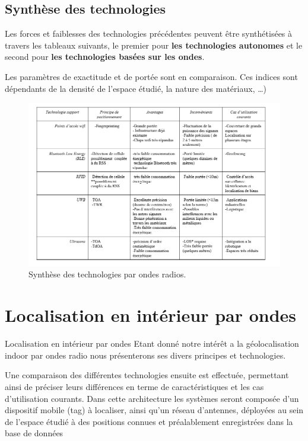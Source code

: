 \documentclass[12pt,a4paper]{report}
\begin{document}
\begin{itemize}
\subsection{Synthèse des technologies}

Les forces et faiblesses des technologies précédentes peuvent être synthétisées à travers les tableaux suivants, le premier pour\textbf{ les technologies autonomes} et le second pour \textbf{les technologies basées sur les ondes}. 

Les paramètres de exactitude et de portée sont en comparaison. Ces indices sont dépendants de la densité de l’espace étudié, la nature des matériaux, …)

	\begin{figure}[H]
	\centering
	\includegraphics[width=1.1\linewidth]{Pics/technologies.PNG}
	\caption{Synthèse des technologies par ondes radios.}
	\label{fig:technologies}
	
\end{figure}



\section{Localisation en intérieur par ondes }

Localisation en intérieur par ondes 
Etant donné notre intérêt a la géolocalisation indoor par ondes radio nous présenterons ses divers principes et technologies. 

Une comparaison des différentes technologies ensuite est effectuée, permettant ainsi de préciser leurs différences en terme de caractéristiques et les cas d’utilisation courants.
Dans cette architecture les systèmes seront composée d’un dispositif mobile (tag) à localiser, ainsi qu'un réseau d’antennes, déployées au sein de l’espace étudié à des positions connues et préalablement enregistrées dans la base de données


\end{itemize}
\end{document}
